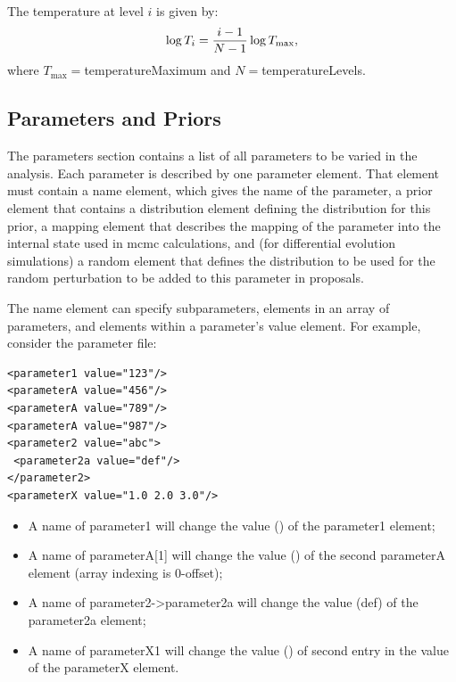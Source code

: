 The temperature at level $i$ is given by:
\begin{equation}
\log T_i = {i-1 \over N-1} \log T_\mathrm{max},
\end{equation}
where $T_\mathrm{max}=${\normalfont \ttfamily temperatureMaximum} and $N=${\normalfont \ttfamily temperatureLevels}.

\subsection{Parameters and Priors}\label{sec:ParametersPriors}

The {\normalfont \ttfamily parameters} section contains a list of all parameters to be varied in the analysis. Each parameter is described by one {\normalfont \ttfamily parameter} element. That element must contain a {\normalfont \ttfamily name} element, which gives the name of the parameter, a {\normalfont \ttfamily prior} element that contains a {\normalfont \ttfamily distribution} element defining the distribution for this prior, a {\normalfont \ttfamily mapping} element that describes the mapping of the parameter into the internal state used in \gls{mcmc} calculations, and (for differential evolution simulations) a {\normalfont \ttfamily random} element that defines the distribution to be used for the random perturbation to be added to this parameter in proposals.

The {\normalfont \ttfamily name} element can specify subparameters, elements in an array of parameters, and elements within a parameter's {\normalfont \ttfamily value} element. For example, consider the parameter file:
\begin{verbatim}
<parameter1 value="123"/>
<parameterA value="456"/>
<parameterA value="789"/>
<parameterA value="987"/>
<parameter2 value="abc">
 <parameter2a value="def"/>
</parameter2>
<parameterX value="1.0 2.0 3.0"/>
\end{verbatim}
\begin{itemize}
\item A name of {\normalfont \ttfamily parameter1} will change the value ({\normalfont {}}) of the {\normalfont \ttfamily parameter1} element;
\item A name of {\normalfont \ttfamily parameterA[1]} will change the value ({\normalfont {}}) of the second {\normalfont \ttfamily parameterA} element (array indexing is 0-offset);
\item A name of {\normalfont \ttfamily parameter2->parameter2a} will change the value ({\normalfont \ttfamily def}) of the {\normalfont \ttfamily parameter2a} element;
\item A name of {\normalfont \ttfamily parameterX{1}} will change the value ({\normalfont {}}) of second entry in the value of the {\normalfont \ttfamily parameterX} element.
\end{itemize}

